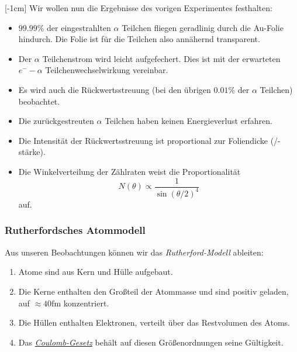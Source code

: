 \documentclass{subfiles}
\begin{document}
    [-1cm]
    \noindent Wir wollen nun die Ergebnisse des vorigen Experimentes festhalten:
    \begin{itemize}
        \item $99.99\si\percent$ der eingestrahlten $\alpha$ Teilchen fliegen geradlinig durch die Au-Folie hindurch. Die Folie ist für die Teilchen also annähernd transparent. 
        \item Der $\alpha$ Teilchenstrom wird leicht aufgefechert. Dies ist mit der erwarteten $e^--\alpha$ Teilchenwechselwirkung vereinbar.
        \item Es wird auch die Rückwertsstreuung (bei den übrigen $0.01\si\percent$ der $\alpha$ Teilchen) beobachtet.
        \item Die zurückgestreuten $\alpha$ Teilchen haben keinen Energieverlust erfahren.
        \item Die Intensität der Rückwertsstreuung ist proportional zur Foliendicke (/-stärke).
        \item Die Winkelverteilung der Zählraten weist die Proportionalität
        \[N(\theta) \propto \frac{1}{\sin(\theta/2)^4}\]
        auf. 
    \end{itemize}
    \subsubsection*{Rutherfordsches Atommodell}\label{Ub:RutherfordModell}\marginnote{$\to$ \hyperref[Ub:AtomEigenschaften]{\faBook}}
    Aus unseren Beobachtungen können wir das \emph{Rutherford-Modell} ableiten:
    \begin{enumerate}[label=(\roman*)]
        \item Atome sind aus Kern und Hülle aufgebaut.
        \item Die Kerne enthalten den Großteil der Atommasse und sind positiv geladen, auf $\approx 40\si{\femto\metre}$ konzentriert.
        \item Die Hüllen enthalten Elektronen, verteilt über das Restvolumen des Atoms.
        \item Das \href{https://de.wikipedia.org/wiki/Coulombsches_Gesetz}{\emph{Coulomb-Gesetz}} behält auf diesen Größenordnungen seine Gültigkeit.
    \end{enumerate}
\end{document}
